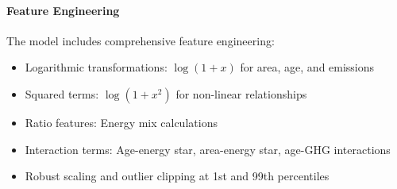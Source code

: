 \paragraph{Feature Engineering}
The model includes comprehensive feature engineering:
\begin{itemize}
\item Logarithmic transformations: $\log(1 + x)$ for area, age, and emissions
\item Squared terms: $\log(1 + x^2)$ for non-linear relationships
\item Ratio features: Energy mix calculations
\item Interaction terms: Age-energy star, area-energy star, age-GHG interactions
\item Robust scaling and outlier clipping at 1st and 99th percentiles
\end{itemize} 